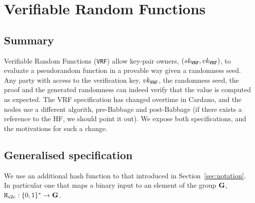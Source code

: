 \section{Verifiable Random Functions}
\label{sec:vrf}

\subsection{Summary}
\newcommand{\sk}{sk}
\newcommand{\vrf}{\texttt{VRF}\xspace}
\newcommand{\vrfsk}{\sk_{\vrf}}
\newcommand{\vrfvk}{\vk_{\vrf}}
\newcommand{\vrfoutput}{\beta}
\newcommand{\vrfproof}{\Pi}
\newcommand{\vrfkeygen}{\texttt{VrfKeyGen}}
\newcommand{\vrfgenerateproof}{\texttt{GenerateProof}}
\newcommand{\parallelsep}{\;||\;}
\newcommand{\true}{\texttt{true}}
\newcommand{\false}{\texttt{false}}


Verifiable Random Functions (\vrf) allow key-pair owners, $(\vrfsk, \vrfvk)$,
to evaluate a pseudorandom function in a provable way given a randomness seed.
Any party with access to the verification key, $\vrfvk$, the
randomness seed, the proof and the generated randomness can indeed verify
that the value is computed as expected. The VRF specification has changed
overtime in Cardano, and the nodes use a different algorith, pre-Babbage and
post-Babbage (if there exists a reference to the HF, we should point it out).
We expose both specifications, and the motivations for such a change.

\subsection{Generalised specification}
We use an additional hash function to that introduced in Section~\ref{sec:notation}. In particular
one that maps a binary input to an element of the group $\mathbf{G}$, $\texttt{H}_{s2c}: \{0,1\}^* \to \mathbf{G}$.

